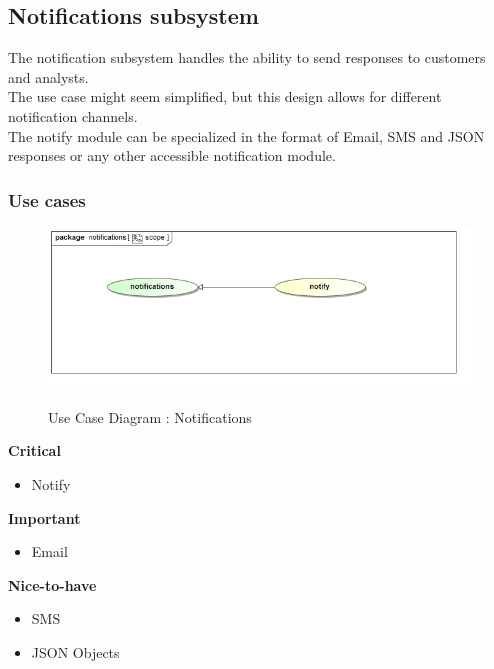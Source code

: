 \documentclass{article}
\begin{document}



	\pagebreak
	\subsection{Notifications subsystem}\label{subsec:Notifcations}
	The notification subsystem handles the ability to send responses to customers and analysts.\\ The use case might seem simplified, but this design allows for different notification channels. \\The notify module can be specialized in the format of Email, SMS and JSON responses or any other accessible notification module.
		\subsubsection{Use cases}
		
		\begin{figure}[H]
		\includegraphics[width=\textwidth]{images/uc__notifications__scope.jpg}  \\
		\caption{Use Case Diagram : Notifications}
		\end{figure}

		\begin{flushleft}
			\textbf{Critical}
				\begin{itemize}
					\item Notify
				\end{itemize}
			\textbf{Important}
				\begin{itemize}
					\item Email
				\end{itemize}
			\textbf{Nice-to-have}
				\begin{itemize}
					\item SMS
					\item JSON Objects
				\end{itemize}
		\end{flushleft}
\end{document}
